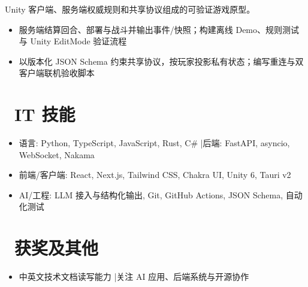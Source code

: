 \documentclass{resume}
\begin{document}
Unity 客户端、服务端权威规则和共享协议组成的可验证游戏原型。
\begin{itemize}
  \item 服务端结算回合、部署与战斗并输出事件/快照；构建离线 Demo、规则测试与 Unity EditMode 验证流程
  \item 以版本化 JSON Schema 约束共享协议，按玩家投影私有状态；编写重连与双客户端联机验收脚本
\end{itemize}

\section{\faCogs\ IT 技能}
\begin{itemize}[parsep=0.3ex]
  \item 语言: Python, TypeScript, JavaScript, Rust, C\# \quad|\quad 后端: FastAPI, asyncio, WebSocket, Nakama
  \item 前端/客户端: React, Next.js, Tailwind CSS, Chakra UI, Unity 6, Tauri v2
  \item AI/工程: LLM 接入与结构化输出, Git, GitHub Actions, JSON Schema, 自动化测试
\end{itemize}

\section{\faHeartO\ 获奖及其他}
\vspace{-0.3ex}
\begin{itemize}[parsep=0.3ex]
  \item 中英文技术文档读写能力 \quad|\quad 关注 AI 应用、后端系统与开源协作
\end{itemize}
\end{document}
